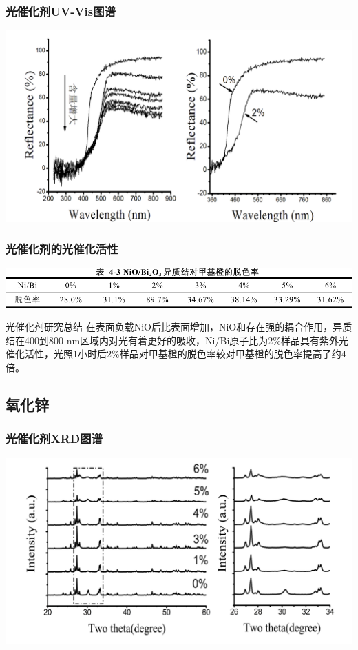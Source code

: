 \documentclass[xetex,compress]{mybeamer}
\begin{document}
\begin{frame}
\frametitle{光催化剂UV-Vis图谱}
\begin{block}{}
\centering
\includegraphics[width=\textwidth]{figures/氧化镍UV} 
\end{block}
\end{frame}


\begin{frame}
\frametitle{光催化剂的光催化活性}
\begin{block}{}
\centering
\includegraphics[width=\textwidth]{figures/氧化镍脱色率} 
\end{block}
\begin{block}{光催化剂研究总结}
在表面负载NiO后比表面增加，NiO和存在强的耦合作用，异质结在400到800 nm区域内对光有着更好的吸收，Ni/Bi原子比为2\%样品具有紫外光催化活性，光照1小时后2\%样品对甲基橙的脱色率较对甲基橙的脱色率提高了约4倍。
\end{block}
\end{frame}


\subsection{氧化锌}
\begin{frame}
\frametitle{光催化剂XRD图谱}
\begin{block}{}
\centering
\includegraphics[width=\linewidth]{figures/氧化锌XRD} 
\end{block}
\end{frame}
\end{document}
